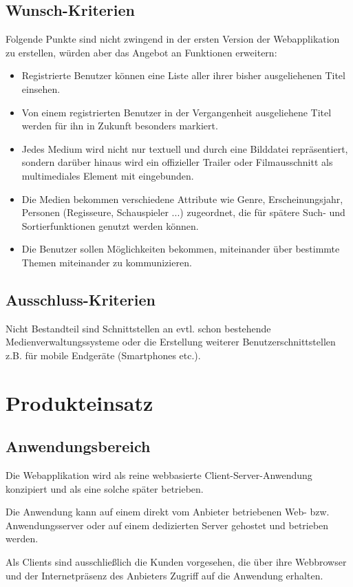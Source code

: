 \documentclass[12pt,oneside,a4paper,bibtotoc,liststotoc,pointlessnumbers]{scrartcl}
\begin{document}
\subsection{Wunsch-Kriterien}
Folgende Punkte sind nicht zwingend in der ersten Version der Webapplikation zu erstellen, würden aber das Angebot an Funktionen erweitern:
\begin{itemize}
\item Registrierte Benutzer können eine Liste aller ihrer bisher ausgeliehenen Titel einsehen.
\item Von einem registrierten Benutzer in der Vergangenheit ausgeliehene Titel werden für ihn in Zukunft besonders markiert.
\item Jedes Medium wird nicht nur textuell und durch eine Bilddatei repräsentiert, sondern darüber hinaus wird ein offizieller Trailer oder Filmausschnitt als multimediales Element mit eingebunden.
\item Die Medien bekommen verschiedene Attribute wie Genre, Erscheinungsjahr, Personen (Regisseure, Schauspieler ...) zugeordnet, die für spätere Such- und Sortierfunktionen genutzt werden können.
\item Die Benutzer sollen Möglichkeiten bekommen, miteinander über bestimmte Themen miteinander zu kommunizieren.
\end{itemize}
\subsection{Ausschluss-Kriterien}
Nicht Bestandteil sind Schnittstellen an evtl. schon bestehende Medienverwaltungssysteme oder die Erstellung weiterer Benutzerschnittstellen z.B. für mobile Endgeräte (Smartphones etc.).
\newpage
\section{Produkteinsatz}
\subsection{Anwendungsbereich}
Die Webapplikation wird als reine webbasierte Client-Server-Anwendung konzipiert und als eine solche später betrieben.\par
Die Anwendung kann auf einem direkt vom Anbieter betriebenen Web- bzw. Anwendungsserver oder auf einem dedizierten Server gehostet und betrieben werden.\par
Als Clients sind ausschließlich die Kunden vorgesehen, die über ihre Webbrowser und der Internetpräsenz des Anbieters Zugriff auf die Anwendung erhalten. 
\end{document}

